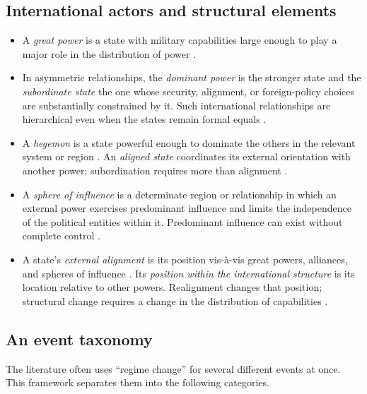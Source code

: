 \documentclass[11pt]{article}
\begin{document}
\subsection{International actors and structural elements}

\begin{itemize}
	\item A \emph{great power} is a state with military capabilities large enough to play a major role in the distribution of power \parencite{mearsheimer_2001}.
	\item In asymmetric relationships, the \emph{dominant power} is the stronger state and the \emph{subordinate state} the one whose security, alignment, or foreign-policy choices are substantially constrained by it. Such international relationships are hierarchical even when the states remain formal equals \parencite{lake_2009}.
	\item A \emph{hegemon} is a state powerful enough to dominate the others in the relevant system or region \parencite{mearsheimer_2001}. An \emph{aligned state} coordinates its external orientation with another power; subordination requires more than alignment \parencite{walt_1987}.
	\item A \emph{sphere of influence} is a determinate region or relationship in which an external power exercises predominant influence and limits the independence of the political entities within it. Predominant influence can exist without complete control \parencite{keal_1983,hast_2014}.
	\item A state's \emph{external alignment} is its position vis-\`a-vis great powers, alliances, and spheres of influence \parencite{walt_1987}. Its \emph{position within the international structure} is its location relative to other powers. Realignment changes that position; structural change requires a change in the distribution of capabilities \parencite{waltz_1979}.
\end{itemize}



\subsection{An event taxonomy}

The literature often uses ``regime change'' for several different events at once. This framework separates them into the following categories.
\end{document}
